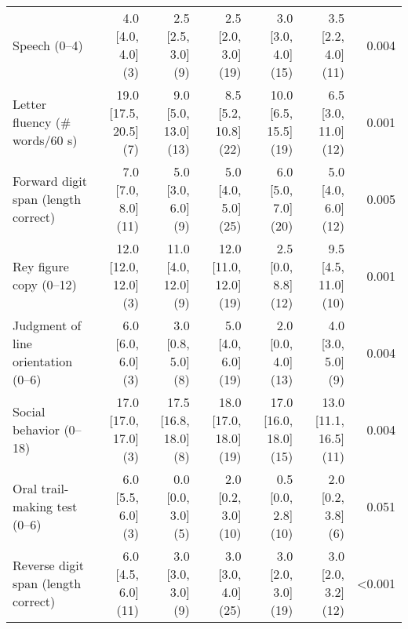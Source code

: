\documentclass[]{article}
\begin{document}
\begin{table}[ht]
{\begin{tabular}{lrrrrrr}
  Speech (0--4) &  4.0 [4.0, 4.0] (3) &  2.5 [2.5, 3.0] (9) &  2.5 [2.0, 3.0] (19) &  3.0 [3.0, 4.0] (15) &  3.5 [2.2, 4.0] (11) &  0.004 \\ 
  Letter fluency (\# words/60 s) & 19.0 [17.5, 20.5] (7) &  9.0 [5.0, 13.0] (13) &  8.5 [5.2, 10.8] (22) & 10.0 [6.5, 15.5] (19) &  6.5 [3.0, 11.0] (12) &  0.001 \\ 
  Forward digit span (length correct) &  7.0 [7.0, 8.0] (11) &  5.0 [3.0, 6.0] (9) &  5.0 [4.0, 5.0] (25) &  6.0 [5.0, 7.0] (20) &  5.0 [4.0, 6.0] (12) &  0.005 \\ 
  Rey figure copy (0--12) & 12.0 [12.0, 12.0] (3) & 11.0 [4.0, 12.0] (9) & 12.0 [11.0, 12.0] (19) &  2.5 [0.0, 8.8] (12) &  9.5 [4.5, 11.0] (10) &  0.001 \\ 
  Judgment of line orientation (0--6) &  6.0 [6.0, 6.0] (3) &  3.0 [0.8, 5.0] (8) &  5.0 [4.0, 6.0] (19) &  2.0 [0.0, 4.0] (13) &  4.0 [3.0, 5.0] (9) &  0.004 \\ 
  Social behavior (0--18) & 17.0 [17.0, 17.0] (3) & 17.5 [16.8, 18.0] (8) & 18.0 [17.0, 18.0] (19) & 17.0 [16.0, 18.0] (15) & 13.0 [11.1, 16.5] (11) &  0.004 \\ 
  Oral trail-making test (0--6) &  6.0 [5.5, 6.0] (3) &  0.0 [0.0, 3.0] (5) &  2.0 [0.2, 3.0] (10) &  0.5 [0.0, 2.8] (10) &  2.0 [0.2, 3.8] (6) &  0.051 \\ 
  Reverse digit span (length correct) &  6.0 [4.5, 6.0] (11) &  3.0 [3.0, 3.0] (9) &  3.0 [3.0, 4.0] (25) &  3.0 [2.0, 3.0] (19) &  3.0 [2.0, 3.2] (12) & <0.001 \\ 
   \hline
\end{tabular}
}
\end{table}
\end{document}
